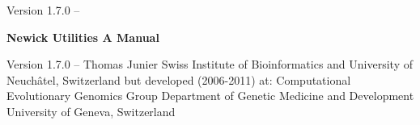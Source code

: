 
\showframe
\setuppagenumbering[state=stop]

\setuplayout[title]

\startalignment[middle]

Version 1.7.0 -- \currentdate \crlf
\blank[2*big]
 \crlf
{} \crlf
{} \crlf
{}
\stopalignment

\page

\startdoctitleframe
{\switchtobodyfont[36pt]\bf\startalignment[center]Newick Utilities \crlf A Manual\stopalignment}
\stopdoctitleframe

\startalignment[center]
Version 1.7.0 -- \currentdate \crlf
\blank[]
Thomas Junier  \crlf
\blank[]
Swiss Institute of Bioinformatics \crlf
and \crlf
University of Neuch\^{a}tel, Switzerland \crlf
but developed (2006-2011) at: \crlf
Computational Evolutionary Genomics Group \crlf
Department of Genetic Medicine and Development \crlf
University of Geneva, Switzerland \crlf
\blank[]
\stopalignment

\page
\setuplayout[reset]
